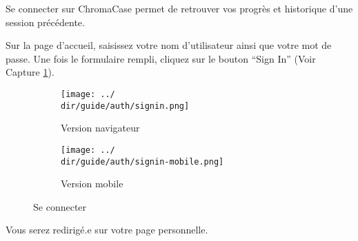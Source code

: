 Se connecter sur ChromaCase permet de retrouver vos progrès et historique d’une session précédente.

Sur la page d'accueil, saisissez votre nom d’utilisateur ainsi que votre mot de passe.
Une fois le formulaire rempli, cliquez sur le bouton “Sign In” (Voir Capture \ref{fig:signin}).

\begin{figure}[H]
	\begin{subfigure}[b]{0.7\textwidth}
		\texttt{[image: ../\\dir/guide/auth/signin.png]}
		\caption{Version navigateur}
	\end{subfigure}
	\begin{subfigure}[b]{0.25\textwidth}
		\texttt{[image: ../\\dir/guide/auth/signin-mobile.png]}
		\caption{Version mobile}
	\end{subfigure}
	\caption{Se connecter}
	\label{fig:signin}
\end{figure}

Vous serez redirigé.e sur votre page personnelle.

